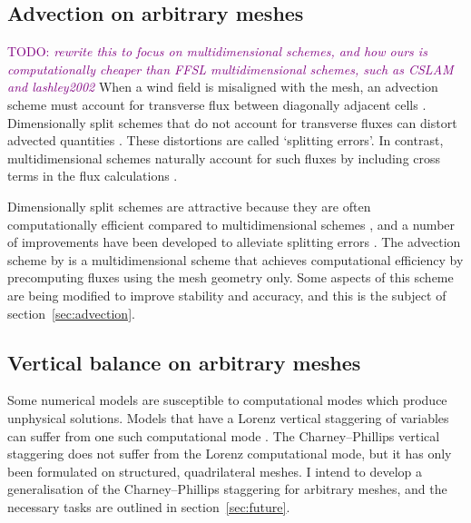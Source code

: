 \documentclass[a4paper,11pt]{article}
\newcommand{\TODO}[1]{\textcolor{purple}{TODO: \emph{#1}}}
\begin{document}
\subsection*{Advection on arbitrary meshes}
\TODO{rewrite this to focus on multidimensional schemes, and how ours is computationally cheaper than FFSL multidimensional schemes, such as CSLAM and lashley2002}
When a wind field is misaligned with the mesh, an advection scheme must account for transverse flux between diagonally adjacent cells \citep{clappier1998}.  Dimensionally split schemes that do not account for transverse fluxes can distort advected quantities \citep{leonard1993}.  These distortions are called `splitting errors'.  In contrast, multidimensional schemes naturally account for such fluxes by including cross terms in the flux calculations \citep{leonard1993}.

Dimensionally split schemes are attractive because they are often computationally efficient compared to multidimensional schemes \citep{bott2010}, and a number of improvements have been developed to alleviate splitting errors \citep{leonard1996,bott2010}.  The advection scheme by \citet{weller-shahrokhi2014} is a multidimensional scheme that achieves computational efficiency by precomputing fluxes using the mesh geometry only.  Some aspects of this scheme are being modified to improve stability and accuracy, and this is the subject of section~\ref{sec:advection}.

\subsection*{Vertical balance on arbitrary meshes}
Some numerical models are susceptible to computational modes which produce unphysical solutions.   Models that have a Lorenz vertical staggering of variables can suffer from one such computational mode \citep{arakawa-konor1996}.  The Charney--Phillips vertical staggering does not suffer from the Lorenz computational mode, but it has only been formulated on structured, quadrilateral meshes.  I intend to develop a generalisation of the Charney--Phillips staggering for arbitrary meshes, and the necessary tasks are outlined in section~\ref{sec:future}.
\end{document}
